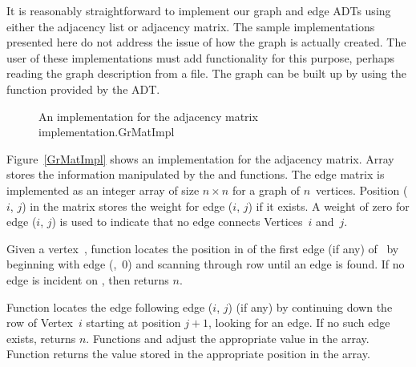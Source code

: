 It is reasonably straightforward to implement our graph and edge ADTs
using either the adjacency list or adjacency matrix.
The sample implementations presented here do not address the issue of
how the graph is actually created.
The user of these implementations must add functionality for
this purpose, perhaps reading the graph description from a file.
The graph can be built up by using the  function
provided by the ADT.

\begin{figure}

\vspace{-\medskipamount}
\vspace{-\bigskipamount}
{An implementation for the adjacency matrix implementation.}{GrMatImpl}
\end{figure}

\begin{figure}
\vspace{-\bigskipamount}
\captcont
\bigskip
\end{figure}

Figure~\ref{GrMatImpl} shows an implementation for the adjacency
matrix.
Array  stores the information manipulated by the
 and  functions.
The edge matrix is implemented as an integer array of size
\(n \times n\) for a graph of \(n\)~vertices.
Position (\(i\), \(j\)) in the matrix stores the weight for edge
(\(i\), \(j\)) if it exists.
A weight of zero for edge (\(i\), \(j\)) is used to indicate that no edge
connects Vertices~\(i\) and~\(j\).

Given a vertex~, function  locates the position in
 of the first edge (if any) of~ by beginning with
edge (,~0) and scanning through row  until an edge
is found.
If no edge is incident on , then  returns \(n\).

Function  locates the edge following edge (\(i\), \(j\)) (if
any) by continuing down the row of Vertex~\(i\) starting at position
\(j+1\), looking for an edge.
If no such edge exists,  returns \(n\).
Functions  and  adjust the
appropriate value in the array.
Function  returns the value stored in the
appropriate position in the array.

